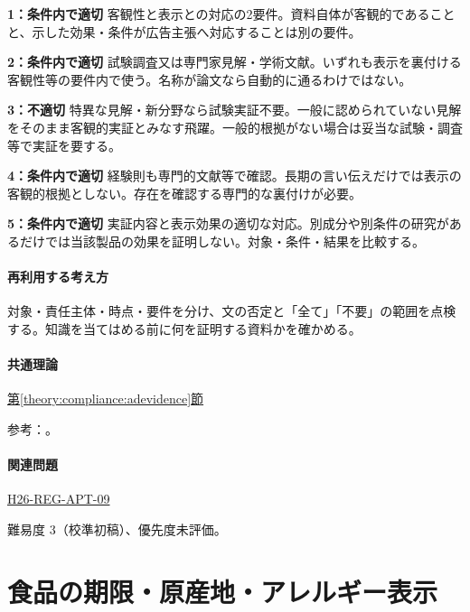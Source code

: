 \noindent\textbf{1：条件内で適切} 客観性と表示との対応の2要件。資料自体が客観的であることと、示した効果・条件が広告主張へ対応することは別の要件。\par

\noindent\textbf{2：条件内で適切} 試験調査又は専門家見解・学術文献。いずれも表示を裏付ける客観性等の要件内で使う。名称が論文なら自動的に通るわけではない。\par

\noindent\textbf{3：不適切} 特異な見解・新分野なら試験実証不要。一般に認められていない見解をそのまま客観的実証とみなす飛躍。一般的根拠がない場合は妥当な試験・調査等で実証を要する。\par

\noindent\textbf{4：条件内で適切} 経験則も専門的文献等で確認。長期の言い伝えだけでは表示の客観的根拠としない。存在を確認する専門的な裏付けが必要。\par

\noindent\textbf{5：条件内で適切} 実証内容と表示効果の適切な対応。別成分や別条件の研究があるだけでは当該製品の効果を証明しない。対象・条件・結果を比較する。\par

\paragraph{再利用する考え方} 対象・責任主体・時点・要件を分け、文の否定と「全て」「不要」の範囲を点検する。知識を当てはめる前に何を証明する資料かを確かめる。

\paragraph{共通理論} \hyperref[theory:compliance:adevidence]{第\ref*{theory:compliance:adevidence}節}

\par 参考：\cite{saf53_ad2016}。

\paragraph{関連問題} \hyperref[q:h26-reg-apt-09]{H26-REG-APT-09}

\par 難易度 3（校準初稿）、優先度未評価。

\section{食品の期限・原産地・アレルギー表示}

